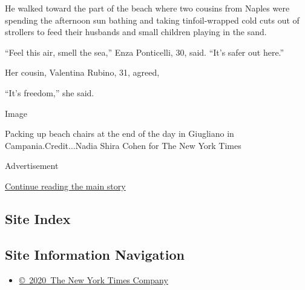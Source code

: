 He walked toward the part of the beach where two cousins from Naples
were spending the afternoon sun bathing and taking tinfoil-wrapped cold
cuts out of strollers to feed their husbands and small children playing
in the sand.

``Feel this air, smell the sea,'' Enza Ponticelli, 30, said. ``It's
safer out here.''

Her cousin, Valentina Rubino, 31, agreed,

``It's freedom,'' she said.

Image

Packing up beach chairs at the end of the day in Giugliano in
Campania.Credit...Nadia Shira Cohen for The New York Times

Advertisement

\protect\hyperlink{after-bottom}{Continue reading the main story}

\hypertarget{site-index}{%
\subsection{Site Index}\label{site-index}}

\hypertarget{site-information-navigation}{%
\subsection{Site Information
Navigation}\label{site-information-navigation}}

\begin{itemize}
\tightlist
\item
  \href{https://help.nytimes3xbfgragh.onion/hc/en-us/articles/115014792127-Copyright-notice}{©~2020~The
  New York Times Company}
\end{itemize}

